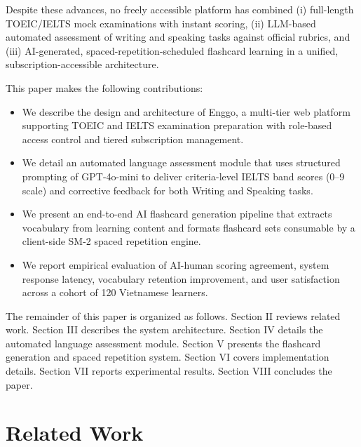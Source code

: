 \documentclass[conference]{IEEEtran}
\begin{document}
Despite these advances, no freely accessible platform has combined (i) full-length TOEIC/IELTS mock examinations with instant scoring, (ii) LLM-based automated assessment of writing and speaking tasks against official rubrics, and (iii) AI-generated, spaced-repetition-scheduled flashcard learning in a unified, subscription-accessible architecture.

This paper makes the following contributions:
\begin{itemize}
    \item We describe the design and architecture of Enggo, a multi-tier web platform supporting TOEIC and IELTS examination preparation with role-based access control and tiered subscription management.
    \item We detail an automated language assessment module that uses structured prompting of GPT-4o-mini to deliver criteria-level IELTS band scores (0–9 scale) and corrective feedback for both Writing and Speaking tasks.
    \item We present an end-to-end AI flashcard generation pipeline that extracts vocabulary from learning content and formats flashcard sets consumable by a client-side SM-2 spaced repetition engine.
    \item We report empirical evaluation of AI-human scoring agreement, system response latency, vocabulary retention improvement, and user satisfaction across a cohort of 120 Vietnamese learners.
\end{itemize}

The remainder of this paper is organized as follows. Section II reviews related work. Section III describes the system architecture. Section IV details the automated language assessment module. Section V presents the flashcard generation and spaced repetition system. Section VI covers implementation details. Section VII reports experimental results. Section VIII concludes the paper.

\section{Related Work}
\end{document}
